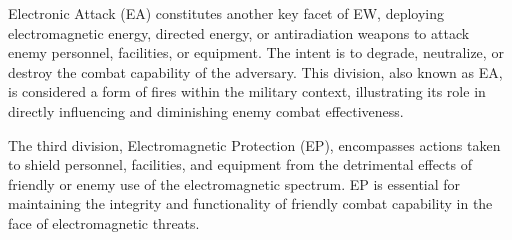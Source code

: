 \documentclass[english, 12pt, a4paper, elec, utf8, a-1b, online]{aaltothesis}
\begin{document}
Electronic Attack (EA) constitutes another key facet of EW, deploying electromagnetic energy, directed energy, or antiradiation weapons to attack enemy personnel, facilities, or equipment. The intent is to degrade, neutralize, or destroy the combat capability of the adversary.
This division, also known as EA, is considered a form of fires within the military context, illustrating its role in directly influencing and diminishing enemy combat effectiveness.

The third division, Electromagnetic Protection (EP), encompasses actions taken to shield personnel, facilities, and equipment from the detrimental effects of friendly or enemy use of the electromagnetic spectrum. EP is essential for maintaining the integrity and functionality of friendly combat capability in the face of electromagnetic threats.





\end{document}
